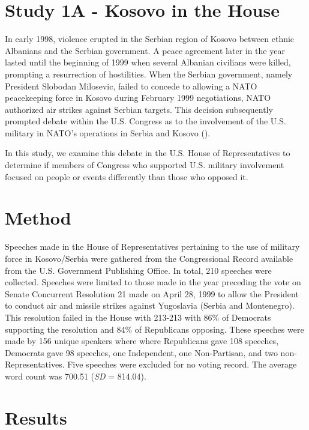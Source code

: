 \documentclass[jou,a4paper]{apa6}
\begin{document}
\section{Study 1A - Kosovo in the House}

In early 1998, violence erupted in the Serbian region of Kosovo between ethnic Albanians and the Serbian government. A peace agreement later in the year lasted until the beginning of 1999 when several Albanian civilians were killed, prompting a resurrection of hostilities. When the Serbian government, namely President Slobodan Milosevic, failed to concede to allowing a NATO peacekeeping force in Kosovo during February 1999 negotiations, NATO authorized air strikes against Serbian targets. This decision subsequently prompted debate within the U.S. Congress as to the involvement of the U.S. military in NATO's operations in Serbia and Kosovo (\cite{Woehrel2006}).

In this study, we examine this debate in the U.S. House of Representatives to determine if members of Congress who supported U.S. military involvement focused on people or events differently than those who opposed it.

\section{Method}

Speeches made in the House of Representatives pertaining to the use of military force in Kosovo/Serbia were gathered from the Congressional Record available from the U.S. Government Publishing Office. In total, 210 speeches were collected. Speeches were limited to those made in the year preceding the vote on Senate Concurrent Resolution 21 made on April 28, 1999 to allow the President to conduct air and missile strikes against Yugoslavia (Serbia and Montenegro). This resolution failed in the House with 213-213 with 86\% of Democrats supporting the resolution and 84\% of Republicans opposing. These speeches were made by 156 unique speakers where where Republicans gave 108 speeches, Democrats gave 98 speeches, one Independent, one Non-Partisan, and two non-Representatives. Five speeches were excluded for no voting record. The average word count was 700.51 (\emph{SD} = 814.04).

\section{Results}
\end{document}
